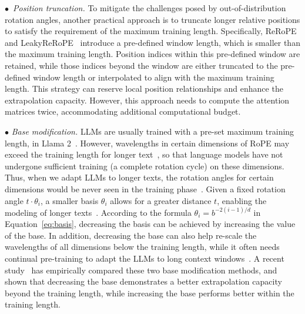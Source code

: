 {$\bullet$~\emph{Position truncation.} To mitigate the challenges posed by out-of-distribution rotation angles, another practical approach is to truncate longer relative positions to satisfy the requirement of the maximum training length. Specifically, ReRoPE and LeakyReRoPE~\cite{su-online-2023-Rerope} introduce a pre-defined window length, which is smaller than the maximum training length. 
Position indices within this pre-defined window are retained, while those indices beyond the window are either truncated to the pre-defined window length or interpolated to align with the maximum training length. This strategy can reserve local position relationships and enhance the extrapolation capacity. %
{However, this approach needs to compute the attention matrices twice, accommodating additional computational budget.}



{
$\bullet$ \emph{Base modification.} 
LLMs are usually trained with a pre-set maximum training length,  in Llama 2~\cite{Touvron-2023-llama2-arxiv}. However, wavelengths in certain dimensions of RoPE may exceed the training length for longer text~\cite{Peng-arxiv-2023-Yarn}, so that language models have not undergone sufficient  training (\ie a complete rotation cycle) on these dimensions. Thus, when we adapt LLMs to longer texts, the rotation angles  for certain dimensions would be never seen in the training phase~\cite{Liu-arxiv-2023_scaling}. 
Given a fixed rotation angle $t\cdot \theta_i$,  a smaller basis $\theta_i$ allows for a greater distance $t$, \ie enabling the modeling of longer texts~\cite{Peng-arxiv-2023-Yarn, Roziere-arxiv-2023-codellama,xiong-arxiv-2023-effective}.
According to the formula $\theta_i=b^{-2(i-1)/d}$ in Equation~\ref{eq:basis}, decreasing the basis can be achieved by increasing the value of the base. In addition,
decreasing the base can also help re-scale the wavelengths of all dimensions below the training length, while it often needs continual pre-training to adapt the LLMs to long context windows~\cite{Liu-arxiv-2023_scaling}.
A recent study~\cite{Liu-arxiv-2023_scaling} has empirically compared these two base modification methods, and shown that decreasing the base demonstrates a better extrapolation capacity beyond the training length, while increasing the base performs better within the training length.
}







}
